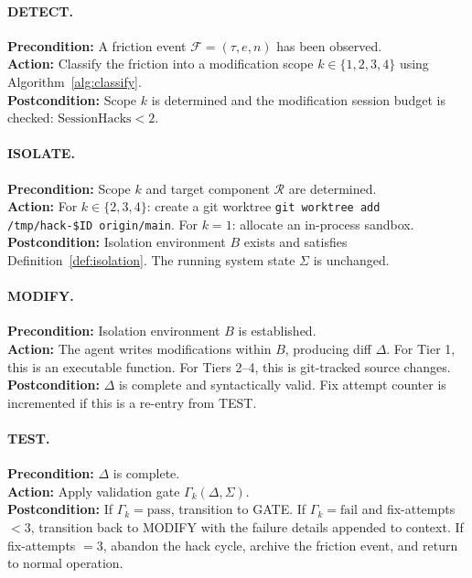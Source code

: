 \documentclass[11pt]{article}
\begin{document}
\paragraph{DETECT.}
\textbf{Precondition:} A friction event $\mathcal{F} = (\tau, e, n)$ has been
observed. \\
\textbf{Action:} Classify the friction into a modification scope
$k \in \{1, 2, 3, 4\}$ using Algorithm~\ref{alg:classify}. \\
\textbf{Postcondition:} Scope $k$ is determined and the modification session
budget is checked: $\text{SessionHacks} < 2$.

\paragraph{ISOLATE.}
\textbf{Precondition:} Scope $k$ and target component $\mathcal{R}$ are
determined. \\
\textbf{Action:} For $k \in \{2, 3, 4\}$: create a git worktree
\texttt{git worktree add /tmp/hack-\$ID origin/main}. For $k = 1$: allocate
an in-process sandbox. \\
\textbf{Postcondition:} Isolation environment $B$ exists and satisfies
Definition~\ref{def:isolation}. The running system state $\Sigma$ is unchanged.

\paragraph{MODIFY.}
\textbf{Precondition:} Isolation environment $B$ is established. \\
\textbf{Action:} The agent writes modifications within $B$, producing diff
$\Delta$. For Tier 1, this is an executable function. For Tiers 2--4, this is
git-tracked source changes. \\
\textbf{Postcondition:} $\Delta$ is complete and syntactically valid. Fix
attempt counter is incremented if this is a re-entry from TEST.

\paragraph{TEST.}
\textbf{Precondition:} $\Delta$ is complete. \\
\textbf{Action:} Apply validation gate $\Gamma_k(\Delta, \Sigma)$. \\
\textbf{Postcondition:} If $\Gamma_k = \text{pass}$, transition to GATE.
If $\Gamma_k = \text{fail}$ and fix-attempts $< 3$, transition back to MODIFY
with the failure details appended to context. If fix-attempts $= 3$, abandon
the hack cycle, archive the friction event, and return to normal operation.
\end{document}
